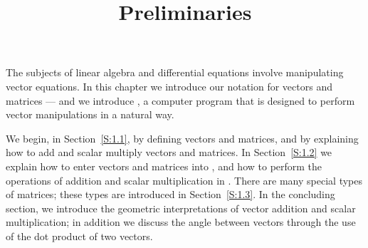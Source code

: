 \documentclass{ximera}
\title{Preliminaries}
\begin{document}
\begin{abstract}
\end{abstract}
\maketitle


\label{chap:prelim}

The subjects of linear algebra and differential equations involve
manipulating vector equations.  In this chapter we introduce our
notation for vectors and matrices --- and we introduce \Matlabp,
a computer program that is designed to perform vector
manipulations in a natural way.

We begin, in Section~\ref{S:1.1}, by defining vectors and matrices, and
by explaining how to add and scalar multiply vectors and matrices.
In Section~\ref{S:1.2} we explain how to enter vectors and matrices
into \Matlabp, and how to perform the operations of addition and
scalar multiplication in \Matlabp.  There are many special types of matrices;
these types are introduced in Section~\ref{S:1.3}. In the concluding
section, we introduce the geometric interpretations of vector addition
and scalar multiplication; in addition we discuss the angle between
vectors through the use of the dot product of two vectors.
\end{document}
